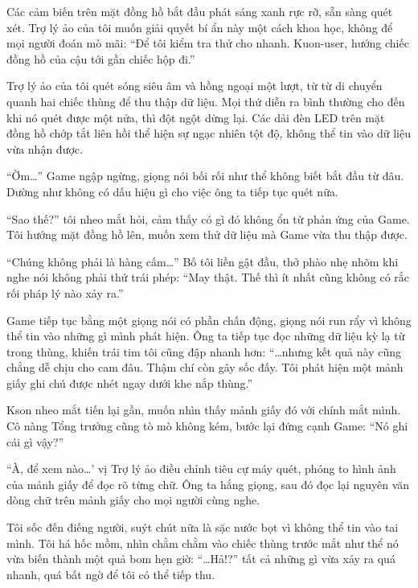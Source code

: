 ﻿\documentclass[../main.tex]{subfiles}
\begin{document}
Các cảm biến trên mặt đồng hồ bắt đầu phát sáng xanh rực rỡ, sẵn sàng quét xét. Trợ lý ảo của tôi muốn giải quyết bí ẩn này một cách khoa học, không để mọi người đoán mò mãi: ``Để tôi kiểm tra thử cho nhanh. Kuon-user, hướng chiếc đồng hồ của cậu tới gần chiếc hộp đi.''

Trợ lý ảo của tôi quét sóng siêu âm và hồng ngoại một lượt, từ từ di chuyển quanh hai chiếc thùng để thu thập dữ liệu. Mọi thứ diễn ra bình thường cho đến khi nó quét được một nửa, thì đột ngột dừng lại. Các dải đèn LED trên mặt đồng hồ chớp tắt liên hồi thể hiện sự ngạc nhiên tột độ, không thể tin vào dữ liệu vừa nhận được.

``Ờm\dots'' Game ngập ngừng, giọng nói bối rối như thể không biết bắt đầu từ đâu. Dường như không có dấu hiệu gì cho việc ông ta tiếp tục quét nữa.

``Sao thế?'' tôi nheo mắt hỏi, cảm thấy có gì đó không ổn từ phản ứng của Game. Tôi hướng mặt đồng hồ lên, muốn xem thử dữ liệu mà Game vừa thu thập được.

``Chúng không phải là hàng cấm\dots'' Bố tôi liền gật đầu, thở phào nhẹ nhõm khi nghe nói không phải thứ trái phép: ``May thật. Thế thì ít nhất cũng không có rắc rối pháp lý nào xảy ra.''

Game tiếp tục bằng một giọng nói có phần chấn động, giọng nói run rẩy vì không thể tin vào những gì mình phát hiện. Ông ta tiếp tục đọc những dữ liệu kỳ lạ từ trong thùng, khiến trái tim tôi cũng đập nhanh hơn: ``\dots nhưng kết quả này cũng chẳng dễ chịu cho cam đâu. Thậm chí còn gây sốc đấy. Tôi phát hiện một mảnh giấy ghi chú được nhét ngay dưới khe nắp thùng.''

Kson nheo mắt tiến lại gần, muốn nhìn thấy mảnh giấy đó với chính mắt mình. Cô nàng Tổng trưởng cũng tò mò không kém, bước lại đứng cạnh Game: ``Nó ghi cái gì vậy?''

``À, để xem nào\dots' vị Trợ lý ảo điều chỉnh tiêu cự máy quét, phóng to hình ảnh của mảnh giấy để đọc rõ từng chữ. Ông ta hắng giọng, sau đó đọc lại nguyên văn dòng chữ trên mảnh giấy cho mọi người cùng nghe.


Tôi sốc đến điếng người, suýt chút nữa là sặc nước bọt vì không thể tin vào tai mình. Tôi há hốc mồm, nhìn chằm chằm vào chiếc thùng trước mắt như thể nó vừa biến thành một quả bom hẹn giờ: ``\dots Hả!?'' tất cả những gì vừa xảy ra quá nhanh, quá bất ngờ để tôi có thể tiếp thu.
\end{document}
